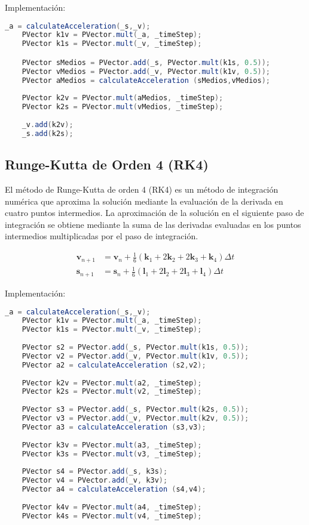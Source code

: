 \documentclass{article}
\begin{document}
Implementación:

\begin{lstlisting}[language = Java, frame = single]
    _a = calculateAcceleration(_s,_v);
    PVector k1v = PVector.mult(_a, _timeStep); 
    PVector k1s = PVector.mult(_v, _timeStep); 

    PVector sMedios = PVector.add(_s, PVector.mult(k1s, 0.5)); 
    PVector vMedios = PVector.add(_v, PVector.mult(k1v, 0.5));  
    PVector aMedios = calculateAcceleration (sMedios,vMedios);
    
    PVector k2v = PVector.mult(aMedios, _timeStep);
    PVector k2s = PVector.mult(vMedios, _timeStep); 
    
    _v.add(k2v);
    _s.add(k2s); 

\end{lstlisting}

\subsection{Runge-Kutta de Orden 4 (RK4)}

El método de Runge-Kutta de orden 4 (RK4) es un método de integración numérica que aproxima la solución mediante la evaluación de la derivada en cuatro puntos intermedios. La aproximación de la solución en el siguiente paso de integración se obtiene mediante la suma de las derivadas evaluadas en los puntos intermedios multiplicadas por el paso de integración.

\begin{align*}
    \mathbf{v}_{n+1} & = \mathbf{v}_n + \frac{1}{6} (\mathbf{k}_1 + 2\mathbf{k}_2 + 2\mathbf{k}_3 + \mathbf{k}_4) \Delta t \\
    \mathbf{s}_{n+1} & = \mathbf{s}_n + \frac{1}{6} (\mathbf{l}_1 + 2\mathbf{l}_2 + 2\mathbf{l}_3 + \mathbf{l}_4) \Delta t
\end{align*}

Implementación:

\begin{lstlisting}[language = Java, frame = single]
    _a = calculateAcceleration(_s,_v);
    PVector k1v = PVector.mult(_a, _timeStep); 
    PVector k1s = PVector.mult(_v, _timeStep);
  
    PVector s2 = PVector.add(_s, PVector.mult(k1s, 0.5));
    PVector v2 = PVector.add(_v, PVector.mult(k1v, 0.5));
    PVector a2 = calculateAcceleration (s2,v2);
  
    PVector k2v = PVector.mult(a2, _timeStep);
    PVector k2s = PVector.mult(v2, _timeStep);
  
    PVector s3 = PVector.add(_s, PVector.mult(k2s, 0.5));
    PVector v3 = PVector.add(_v, PVector.mult(k2v, 0.5));  
    PVector a3 = calculateAcceleration (s3,v3);
  
    PVector k3v = PVector.mult(a3, _timeStep);
    PVector k3s = PVector.mult(v3, _timeStep);
  
    PVector s4 = PVector.add(_s, k3s);
    PVector v4 = PVector.add(_v, k3v);  
    PVector a4 = calculateAcceleration (s4,v4);
  
    PVector k4v = PVector.mult(a4, _timeStep);
    PVector k4s = PVector.mult(v4, _timeStep);
\end{lstlisting}
\end{document}
